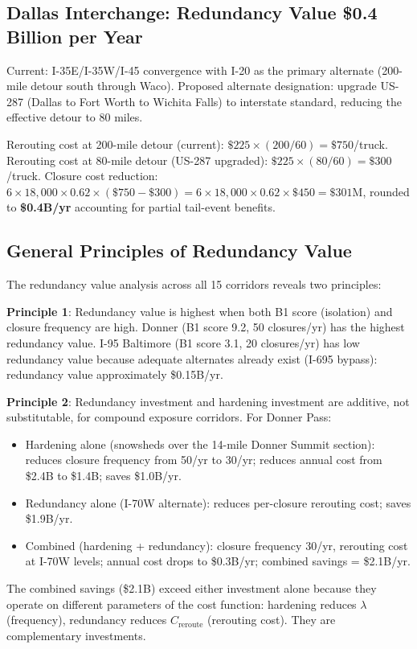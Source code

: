 \subsection{Dallas Interchange: Redundancy Value \$0.4 Billion per Year}

Current: I-35E/I-35W/I-45 convergence with I-20 as the primary alternate (200-mile
detour south through Waco). Proposed alternate designation: upgrade US-287 (Dallas to
Fort Worth to Wichita Falls) to interstate standard, reducing the effective detour
to 80 miles.

Rerouting cost at 200-mile detour (current): $\$225 \times (200/60) = \$750$/truck.
Rerouting cost at 80-mile detour (US-287 upgraded): $\$225 \times (80/60) = \$300$/truck.
Closure cost reduction: $6 \times 18,000 \times 0.62 \times (\$750 - \$300) = 6 \times
18,000 \times 0.62 \times \$450 = \$301\text{M}$, rounded to \textbf{\$0.4B/yr}
accounting for partial tail-event benefits.

\subsection{General Principles of Redundancy Value}

The redundancy value analysis across all 15 corridors reveals two principles:

\textbf{Principle 1}: Redundancy value is highest when both B1 score (isolation) and
closure frequency are high. Donner (B1 score 9.2, 50 closures/yr) has the highest
redundancy value. I-95 Baltimore (B1 score 3.1, 20 closures/yr) has low redundancy
value because adequate alternates already exist (I-695 bypass): redundancy value
approximately \$0.15B/yr.

\textbf{Principle 2}: Redundancy investment and hardening investment are additive, not
substitutable, for compound exposure corridors. For Donner Pass:
\begin{itemize}
\item Hardening alone (snowsheds over the 14-mile Donner Summit section): reduces closure
frequency from 50/yr to 30/yr; reduces annual cost from \$2.4B to \$1.4B; saves \$1.0B/yr.
\item Redundancy alone (I-70W alternate): reduces per-closure rerouting cost; saves
\$1.9B/yr.
\item Combined (hardening + redundancy): closure frequency 30/yr, rerouting cost at I-70W
levels; annual cost drops to \$0.3B/yr; combined savings = \$2.1B/yr.
\end{itemize}
The combined savings (\$2.1B) exceed either investment alone because they operate on
different parameters of the cost function: hardening reduces $\lambda$ (frequency),
redundancy reduces $C_\text{reroute}$ (rerouting cost). They are complementary investments.

